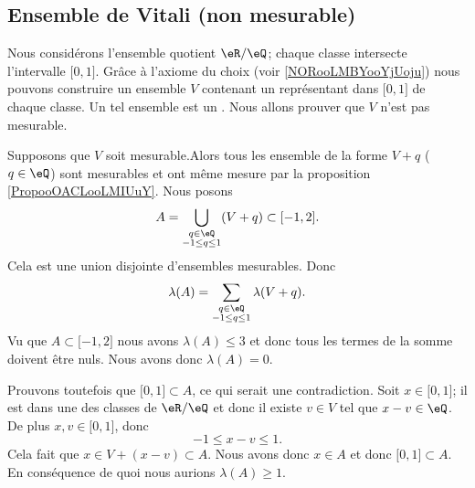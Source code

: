 \subsection{Ensemble de Vitali (non mesurable)}

\begin{example}      \label{EXooCZCFooRPgKjj}
    Nous considérons\cite{ooIARBooPdOgAQ} 
    l'ensemble quotient \( \eR/\eQ\); chaque classe intersecte l'intervalle \( \mathopen[ 0 , 1 \mathclose]\). Grâce à l'axiome du choix (voir \ref{NORooLMBYooYjUoju}) nous pouvons construire un ensemble \( V\) contenant un représentant dans \( \mathopen[ 0 , 1 \mathclose]\) de chaque classe. Un tel ensemble est un . Nous allons prouver que \( V\) n'est pas mesurable.

    Supposons que \( V\) soit mesurable.Alors tous les ensemble de la forme \( V+q\) (\( q\in \eQ\)) sont mesurables et ont même mesure par la proposition \ref{PropooOACLooLMIUuY}. Nous posons
    \begin{equation}
        A=\bigcup_{\substack{q\in\eQ\\-1\leq q\leq 1}}(V+q)\subset\mathopen[ -1 , 2 \mathclose].
    \end{equation}
    Cela est une union disjointe d'ensembles mesurables. Donc
    \begin{equation}
        \lambda(A)=\sum_{\substack{q\in\eQ\\-1\leq q\leq 1}}\lambda(V+q).
    \end{equation}
    Vu que \( A\subset\mathopen[ -1 , 2 \mathclose]\) nous avons \( \lambda(A)\leq 3\) et donc tous les termes de la somme doivent être nuls. Nous avons donc \( \lambda(A)=0\).

    Prouvons toutefois que \( \mathopen[ 0 , 1 \mathclose]\subset A\), ce qui serait une contradiction. Soit \( x\in\mathopen[ 0 , 1 \mathclose]\); il est dans une des classes de \( \eR/\eQ\) et donc il existe \( v\in V\) tel que \( x-v\in \eQ\). De plus \( x,v\in \mathopen[ 0 , 1 \mathclose]\), donc
    \begin{equation}
        -1\leq x-v\leq 1.
    \end{equation}
    Cela fait que \( x\in V+(x-v)\subset A\). Nous avons donc \( x\in A\) et donc \( \mathopen[ 0 , 1 \mathclose]\subset A\). En conséquence de quoi nous aurions \( \lambda(A)\geq 1\).
\end{example}


